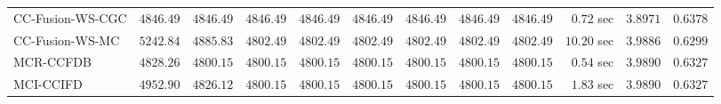 \begin{table}[H]
\begin{tabular}{lrrrrrrrrrrr}
    CC-Fusion-WS-CGC & $      4846.49$ & $      4846.49$ & $      4846.49$ & $      4846.49$ & $      4846.49$ & $      4846.49$ & $      4846.49$ & $      4846.49$ & $         0.72$ sec    & $       3.8971$  & $       0.6378$ \\ 
     CC-Fusion-WS-MC & $      5242.84$ & $      4885.83$ & $      4802.49$ & $      4802.49$ & $      4802.49$ & $      4802.49$ & $      4802.49$ & $      4802.49$ & $        10.20$ sec    & $       3.9886$  & $       0.6299$ \\ 
\cmidrule{1-1} 
           MCR-CCFDB & $      4828.26$ & $      4800.15$ & $      4800.15$ & $      4800.15$ & $      4800.15$ & $      4800.15$ & $      4800.15$ & $      4800.15$ & $         0.54$ sec    & $       3.9890$  & $       0.6327$ \\ 
\cmidrule{1-1} 
           MCI-CCIFD & $      4952.90$ & $      4826.12$ & $      4800.15$ & $      4800.15$ & $      4800.15$ & $      4800.15$ & $      4800.15$ & $      4800.15$ & $         1.83$ sec    & $       3.9890$  & $       0.6327$ \\ 
\bottomrule
\end{tabular}
\end{table}

